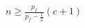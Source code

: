 \documentclass{article}
\begin{document}


$n \geq \frac{p_f}{p_f-\frac{1}{2}}(c+1)$
\end{document}
